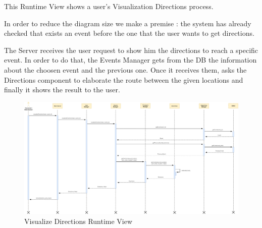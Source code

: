 This Runtime View shows a user's Visualization Directions process.\par
In order to reduce the diagram size we make a premise : the system has already checked that exists an event before the one that the user wants to get directions.\par
The Server receives the user request to show him the directions to reach a specific event. In order to do that, the Events Manager gets from the DB the information about the choosen event and the previous one. Once it receives them, asks the Directions component to elaborate the route between the given locations and finally it shows the result to the user.
\begin{figure}[H]
	\centering
	\includegraphics[scale=0.16]{Images/Runtime/Visualize_Directions}
	\caption{Visualize Directions Runtime View}
\end{figure}

